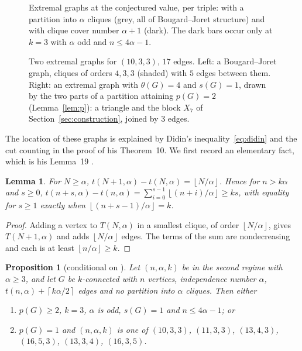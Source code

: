 \documentclass[11pt]{article}
\newtheorem{proposition}[theorem]{Proposition}
\newtheorem{lemma}[theorem]{Lemma}
\theoremstyle{definition}
\theoremstyle{remark}
\newcommand{\ceil}[1]{\left\lceil #1\right\rceil}
\newcommand{\floor}[1]{\left\lfloor #1\right\rfloor}
\begin{document}
\begin{figure}[t]
\centering

\caption{Extremal graphs at the conjectured value, per triple: with a partition into $\alpha$ cliques (grey, all of
Bougard--Joret structure) and with clique cover number $\alpha+1$ (dark). The dark bars occur only at $k=3$ with
$\alpha$ odd and $n\le4\alpha-1$.}
\label{fig:partition}
\end{figure}

\begin{figure}[t]
\centering

\caption{Two extremal graphs for $(10,3,3)$, $17$ edges. Left: a Bougard--Joret graph, cliques of orders $4,3,3$ (shaded)
with $5$ edges between them. Right: an extremal graph with $\theta(G)=4$ and $s(G)=1$, drawn by the two parts of a
partition attaining $p(G)=2$ (Lemma~\ref{lem:p}): a triangle and the block $X_7$ of Section~\ref{sec:construction},
joined by $3$ edges.}
\label{fig:graphs}
\end{figure}

The location of these graphs is explained by Didin's inequality~\eqref{eq:didin} and the cut counting in the proof of
his Theorem~10. We first record an elementary fact, which is his Lemma~19 \cite{Didin}.

\begin{lemma}\label{lem:tshift}
For $N\ge\alpha$, $t(N+1,\alpha)-t(N,\alpha)=\floor{N/\alpha}$. Hence for $n>k\alpha$ and $s\ge0$,
$t(n+s,\alpha)-t(n,\alpha)=\sum_{i=0}^{s-1}\floor{(n+i)/\alpha}\ge ks$, with equality for $s\ge1$ exactly when
$\floor{(n+s-1)/\alpha}=k$.
\end{lemma}

\begin{proof}
Adding a vertex to $T(N,\alpha)$ in a smallest clique, of order $\floor{N/\alpha}$, gives $T(N+1,\alpha)$ and adds
$\floor{N/\alpha}$ edges. The terms of the sum are nondecreasing and each is at least $\floor{n/\alpha}\ge k$.
\end{proof}

\begin{proposition}[conditional on {\cite[Theorem~3]{Didin}}]\label{prop:where}
Let $(n,\alpha,k)$ be in the second regime with $\alpha\ge3$, and let $G$ be $k$-connected with $n$ vertices,
independence number $\alpha$, $t(n,\alpha)+\ceil{k\alpha/2}$ edges and no partition into $\alpha$ cliques. Then either
\begin{enumerate}
\item[(a)] $p(G)\ge2$, $k=3$, $\alpha$ is odd, $s(G)=1$ and $n\le4\alpha-1$; or
\item[(b)] $p(G)=1$ and $(n,\alpha,k)$ is one of $(10,3,3)$, $(11,3,3)$, $(13,4,3)$, $(16,5,3)$, $(13,3,4)$,
$(16,3,5)$.
\end{enumerate}
\end{proposition}
\end{document}
